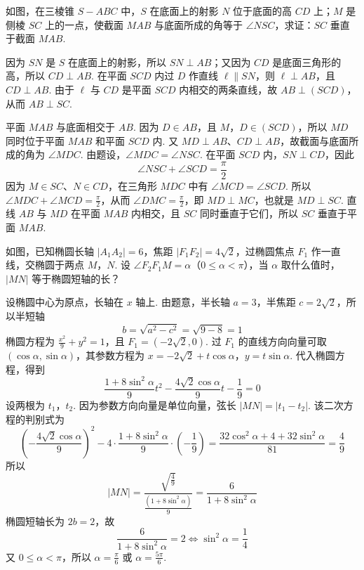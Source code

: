 \begin{problem}
如图，在三棱锥 \(S - ABC\) 中，\(S\) 在底面上的射影 \(N\) 位于底面的高 \(CD\) 上；\(M\) 是侧棱 \(SC\) 上的一点，使截面 \(MAB\) 与底面所成的角等于 \(\angle NSC\)，求证：\(SC\) 垂直于截面 \(MAB\).


\begin{solution}
因为 \(SN\) 是 \(S\) 在底面上的射影，所以 \(SN\perp AB\)；又因为 \(CD\) 是底面三角形的高，所以 \(CD\perp AB\). 在平面 \(SCD\) 内过 \(D\) 作直线 \(\ell\parallel SN\)，则 \(\ell\perp AB\)，且 \(CD\perp AB\). 由于 \(\ell\) 与 \(CD\) 是平面 \(SCD\) 内相交的两条直线，故 \(AB\perp\left(SCD\right)\)，从而 \(AB\perp SC\).

平面 \(MAB\) 与底面相交于 \(AB\). 因为 \(D\in AB\)，且 \(M\)，\(D\in\left(SCD\right)\)，所以 \(MD\) 同时位于平面 \(MAB\) 和平面 \(SCD\) 内. 又 \(MD\perp AB\)、\(CD\perp AB\)，故截面与底面所成的角为 \(\angle MDC\). 由题设，\(\angle MDC=\angle NSC\). 在平面 \(SCD\) 内，\(SN\perp CD\)，因此
\[
\angle NSC+\angle SCD=\frac{\pi}{2}
\]
因为 \(M\in SC\)、\(N\in CD\)，在三角形 \(MDC\) 中有 \(\angle MCD=\angle SCD\). 所以 \(\angle MDC+\angle MCD=\frac{\pi}{2}\)，从而 \(\angle DMC=\frac{\pi}{2}\)，即 \(MD\perp MC\)，也就是 \(MD\perp SC\). 直线 \(AB\) 与 \(MD\) 在平面 \(MAB\) 内相交，且 \(SC\) 同时垂直于它们，所以 \(SC\) 垂直于平面 \(MAB\).
\end{solution}
\end{problem}

\begin{problem}
如图，已知椭圆长轴 \(\left|A_{1}A_{2}\right| = 6\)，焦距 \(\left|F_{1}F_{2}\right| = 4\sqrt{2}\)，过椭圆焦点 \(F_{1}\) 作一直线，交椭圆于两点 \(M\)，\(N\). 设 \(\angle F_{2}F_{1}M = \alpha\)（\(0 \leqslant \alpha < \pi\)），当 \(\alpha\) 取什么值时，\(|MN|\) 等于椭圆短轴的长？


\begin{solution}
设椭圆中心为原点，长轴在 \(x\) 轴上. 由题意，半长轴 \(a=3\)，半焦距 \(c=2\sqrt{2}\)，所以半短轴
\[
b=\sqrt{a^{2}-c^{2}}=\sqrt{9-8}=1
\]
椭圆方程为 \(\frac{x^{2}}{9}+y^{2}=1\)，且 \(F_{1}=(-2\sqrt{2},0)\). 过 \(F_{1}\) 的直线方向向量可取 \((\cos\alpha,\sin\alpha)\)，其参数方程为
\(x=-2\sqrt{2}+t\cos\alpha\)，\(y=t\sin\alpha\).
代入椭圆方程，得到
\[
\frac{1+8\sin^{2}\alpha}{9}t^{2}-\frac{4\sqrt{2}\cos\alpha}{9}t-\frac{1}{9}=0
\]
设两根为 \(t_{1}\)，\(t_{2}\). 因为参数方向向量是单位向量，弦长 \(|MN|=|t_{1}-t_{2}|\). 该二次方程的判别式为
\[
\left(-\frac{4\sqrt{2}\cos\alpha}{9}\right)^{2}
-4\cdot\frac{1+8\sin^{2}\alpha}{9}\cdot\left(-\frac{1}{9}\right)
=\frac{32\cos^{2}\alpha+4+32\sin^{2}\alpha}{81}
=\frac{4}{9}
\]
所以
\[
|MN|=\frac{\sqrt{\frac{4}{9}}}{\frac{(1+8\sin^{2}\alpha)}{9}}=\frac{6}{1+8\sin^{2}\alpha}
\]
椭圆短轴长为 \(2b=2\)，故
\[
\frac{6}{1+8\sin^{2}\alpha}=2\iff \sin^{2}\alpha=\frac14
\]
又 \(0\leqslant\alpha<\pi\)，所以 \(\alpha=\frac{\pi}{6}\) 或 \(\alpha=\frac{5\pi}{6}\).
\end{solution}
\end{problem}

